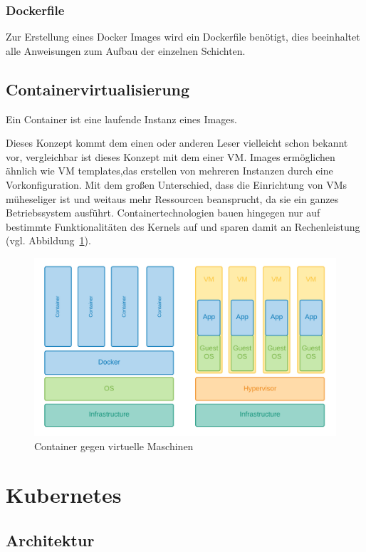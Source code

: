 \subsubsection{Dockerfile}
Zur Erstellung eines Docker Images wird ein Dockerfile benötigt, dies beeinhaltet alle Anweisungen
zum Aufbau der einzelnen Schichten.

\subsection{Containervirtualisierung}
Ein Container ist eine laufende Instanz eines Images.



Dieses Konzept kommt dem einen oder anderen Leser vielleicht schon bekannt vor,
vergleichbar ist dieses Konzept mit dem einer VM.
Images ermöglichen ähnlich wie VM templates,das erstellen von mehreren Instanzen durch eine Vorkonfiguration.
Mit dem großen Unterschied, dass die Einrichtung von VMs müheseliger ist und weitaus mehr Ressourcen
beansprucht, da sie ein ganzes Betriebssystem ausführt. Containertechnologien bauen hingegen nur auf 
bestimmte Funktionalitäten des Kernels auf und sparen damit an Rechenleistung (vgl. Abbildung~\ref{fig:containervm}).

\begin{figure}
    \centering
    \includegraphics[width=1.0\columnwidth]{images/Container-VM.png}
    \caption{Container gegen virtuelle Maschinen \protect}
    \label{fig:containervm}
\end{figure}

\section{Kubernetes}
\subsection{Architektur}
